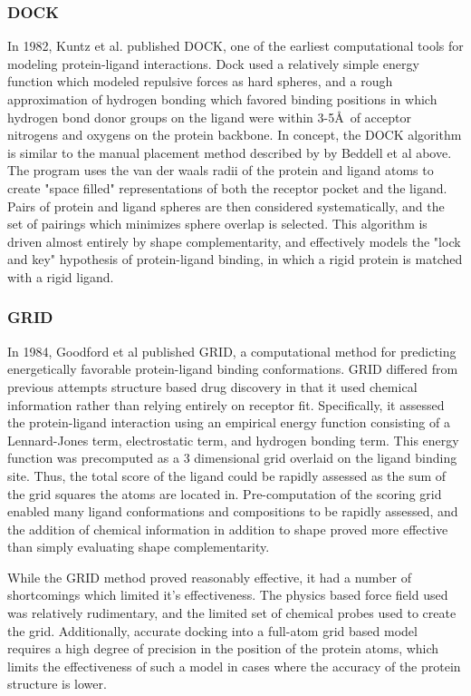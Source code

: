 \subsubsection{DOCK}
In 1982, Kuntz et al. published DOCK, one of the earliest computational tools for modeling protein-ligand interactions\citep{Kuntz:1982wx}.  Dock used a relatively simple energy function which modeled repulsive forces as hard spheres, and a rough approximation of hydrogen bonding which favored binding positions in which hydrogen bond donor groups on the ligand were within 3-5\AA\ of acceptor nitrogens and oxygens on the protein backbone.
In concept, the DOCK algorithm is similar to the manual placement method described by by Beddell et al above. 
The program uses the van der waals radii of the protein and ligand atoms to create "space filled" representations of both the receptor pocket and the ligand.
Pairs of protein and ligand spheres are then considered systematically, and the set of pairings which minimizes sphere overlap is selected.
This algorithm is driven almost entirely by shape complementarity, and effectively models the "lock and key" hypothesis of protein-ligand binding, in which a rigid protein is matched with a rigid ligand.

\subsubsection{GRID}
In 1984, Goodford et al published GRID, a computational method for predicting energetically favorable protein-ligand binding conformations\citep{Goodford:1985bf}.
GRID differed from previous attempts structure based drug discovery in that it used chemical information rather than relying entirely on receptor fit. 
Specifically, it assessed the protein-ligand interaction using an empirical energy function consisting of a Lennard-Jones term, electrostatic term, and hydrogen bonding term.
This energy function was precomputed as a 3 dimensional grid overlaid on the ligand binding site.
Thus, the total score of the ligand could be rapidly assessed as the sum of the grid squares the atoms are located in.
Pre-computation of the scoring grid enabled many ligand conformations and compositions to be rapidly assessed, and the addition of chemical information in addition to shape proved more effective than simply evaluating shape complementarity.

While the GRID method proved reasonably effective, it had a number of shortcomings which limited it's effectiveness.
The physics based force field used was relatively rudimentary, and the limited set of chemical probes used to create the grid.
Additionally, accurate docking into a full-atom grid based model requires a high degree of precision in the position of the protein atoms, which limits the effectiveness of such a model in cases where the accuracy of the protein structure is lower.

